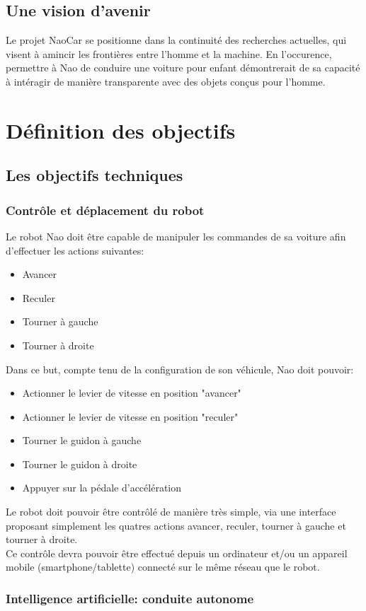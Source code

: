 \documentclass[11pt]{report} %
\begin{document}
	\section{Une vision d'avenir}
			Le projet NaoCar se positionne dans la continuité des recherches actuelles, qui visent à amincir les frontières entre l'homme et la machine. En l'occurence, permettre à Nao de conduire une voiture pour enfant démontrerait de sa capacité à intéragir de manière transparente avec des objets conçus pour l'homme.
\chapter{Définition des objectifs}
	\section{Les objectifs techniques}
		\subsection{Contrôle et déplacement du robot}
			Le robot Nao doit être capable de manipuler les commandes de sa voiture afin d'effectuer les actions suivantes:
\begin{itemize}
\item Avancer
\item Reculer
\item Tourner à gauche
\item Tourner à droite
\end{itemize}
			Dans ce but, compte tenu de la configuration de son véhicule, Nao doit pouvoir:
\begin{itemize}
\item Actionner le levier de vitesse en position "avancer"
\item Actionner le levier de vitesse en position "reculer"
\item Tourner le guidon à gauche
\item Tourner le guidon à droite
\item Appuyer sur la pédale d'accélération
\end{itemize}
			Le robot doit pouvoir être contrôlé de manière très simple, via une interface proposant simplement les quatres actions avancer, reculer, tourner à gauche et tourner à droite.\\
			Ce contrôle devra pouvoir être effectué depuis un ordinateur et/ou un appareil mobile (smartphone/tablette) connecté sur le même réseau que le robot.
		\newpage
		\subsection{Intelligence artificielle: conduite autonome}
\end{document}
